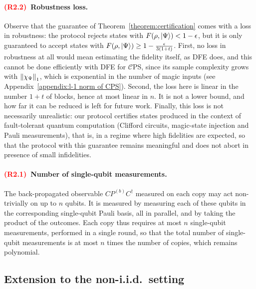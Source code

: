 \documentclass[a4paper,twocolumn,11pt,unpublished]{quantumarticle}
\newcommand{\CEPS}{$\mathcal C$PS}
\newif\ifhighlightchanges \highlightchangestrue
\newcommand{\revother}[1]{\ifhighlightchanges{\color{red}#1}\else#1\fi}
\newcommand{\revtag}[1]{\ifhighlightchanges\textcolor{red}{\textbf{(#1)}}\ \fi}
\begin{document}
        \revother{\paragraph{\revtag{R2.2}Robustness loss.}
        Observe that the guarantee of Theorem~\ref{theorem:certification} comes with a loss in robustness: the protocol rejects states with $F(\rho,\ket\Psi)<1-\epsilon$, but it is only guaranteed to accept states with $F(\rho,\ket\Psi)\ge1-\frac{\epsilon}{3(1+t)}$. First, no loss in robustness at all would mean estimating the fidelity itself, as DFE does, and this cannot be done efficiently with DFE for \CEPS, since its sample complexity grows with $\left\lVert\chi_\Psi\right\rVert_1$, which is exponential in the number of magic inputs (see Appendix~\ref{appendix:l-1 norm of CPS}). Second, the loss here is linear in the number $1+t$ of blocks, hence at most linear in $n$. It is not a lower bound, and how far it can be reduced is left for future work. Finally, this loss is not necessarily unrealistic: our protocol certifies states produced in the context of fault-tolerant quantum computation (Clifford circuits, magic-state injection and Pauli measurements), that is, in a regime where high fidelities are expected, so that the protocol with this guarantee remains meaningful and does not abort in presence of small infidelities.}

        \revother{\paragraph{\revtag{R2.1}Number of single-qubit measurements.}
        The back-propagated observable $CP^{(b)}C^\dagger$ measured on each copy may act non-trivially on up to $n$ qubits. It is measured by measuring each of these qubits in the corresponding single-qubit Pauli basis, all in parallel, and by taking the product of the outcomes. Each copy thus requires at most $n$ single-qubit measurements, performed in a single round, so that the total number of single-qubit measurements is at most $n$ times the number of copies, which remains polynomial.}


\subsection{Extension to the non-i.i.d.\ setting}
\end{document}
